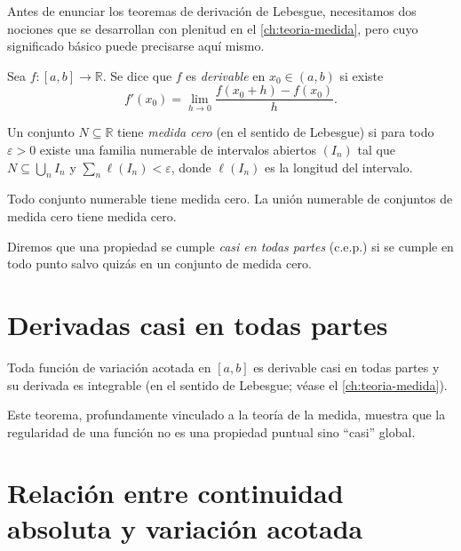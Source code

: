 Antes de enunciar los teoremas de derivación de Lebesgue, necesitamos dos nociones que se desarrollan con plenitud en el \cref{ch:teoria-medida}, pero cuyo significado básico puede precisarse aquí mismo.

\begin{definition}
\label{def:derivada-puntual}
Sea $f\colon[a,b]\to\mathbb{R}$. Se dice que $f$ es \emph{derivable} en $x_0\in(a,b)$ si existe
\[
  f'(x_0)=\lim_{h\to 0}\frac{f(x_0+h)-f(x_0)}{h}.
\]
\end{definition}

\begin{definition}
\label{def:medida-cero-elemental}
Un conjunto $N\subseteq\mathbb{R}$ tiene \emph{medida cero} (en el sentido de Lebesgue) si para todo $\varepsilon>0$ existe una familia numerable de intervalos abiertos $(I_n)$ tal que $N\subseteq\bigcup_n I_n$ y $\sum_n \ell(I_n)<\varepsilon$, donde $\ell(I_n)$ es la longitud del intervalo.
\end{definition}

\begin{proposition}
\label{prop:medida-cero-numerable}
Todo conjunto numerable tiene medida cero. La unión numerable de conjuntos de medida cero tiene medida cero.
\end{proposition}

Diremos que una propiedad se cumple \emph{casi en todas partes} (c.e.p.) si se cumple en todo punto salvo quizás en un conjunto de medida cero.

\section{Derivadas casi en todas partes}

\begin{theorem}[Lebesgue]
\label{teo:lebesgue-derivada}
Toda función de variación acotada en $[a,b]$ es derivable casi en todas partes y su derivada es integrable (en el sentido de Lebesgue; véase el \cref{ch:teoria-medida}).
\end{theorem}

Este teorema, profundamente vinculado a la teoría de la medida, muestra que la regularidad de una función no es una propiedad puntual sino ``casi'' global.

\section{Relación entre continuidad absoluta y variación acotada}

